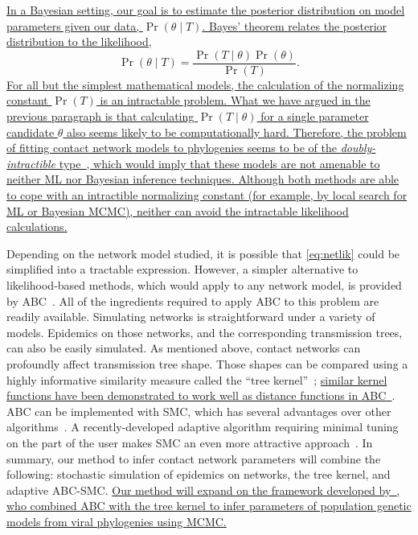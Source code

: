 {\color{blue}\uline{
In a Bayesian setting, our goal is to estimate the posterior distribution on
model parameters given our data, $\Pr(\theta \mid T)$. Bayes' theorem relates
the posterior distribution to the likelihood,}
\[
  \Pr(\theta \mid T) = \frac{\Pr(T \mid \theta) \Pr(\theta)}{\Pr(T)}.
\]
\uline{For all but the simplest mathematical models, the calculation of the
normalizing constant $\Pr(T)$ is an intractable problem. What we have argued in
the previous paragraph is that calculating $\Pr(T \mid \theta)$ for a single
parameter candidate $\theta$ also seems likely to be computationally hard.
Therefore, the problem of fitting contact network models to phylogenies seems
to be of the \emph{doubly-intractible} type~\autocite{murray2012mcmc}, which
would imply that these models are not amenable to neither \gls{ML} nor Bayesian
inference techniques. Although both methods are able to cope with an
intractible normalizing constant (for example, by local search for \gls{ML} or
Bayesian \gls{MCMC}), neither can avoid the intractable likelihood
calculations. }}

Depending on the network model studied, it is possible that \cref{eq:netlik}
could be simplified into a tractable expression. However, a simpler alternative
to likelihood-based methods, which would apply to any network model, is
provided by \gls{ABC}~\autocite{rubin1984bayesianly, tavare1997inferring,
fu1997estimating, beaumont2002approximate}. All of the ingredients required to
apply \gls{ABC} to this problem are readily available. Simulating networks is
straightforward under a variety of models. Epidemics on those networks, and the
corresponding transmission trees, can also be easily simulated. As mentioned
above, contact networks can profoundly affect transmission tree shape. Those
shapes can be compared using a highly informative similarity measure called the
``tree kernel''~\autocite{poon2013mapping}; {\color{blue}\uline{similar kernel
functions have been demonstrated to work well as distance functions in
\gls{ABC}~\autocite{park2015k2}}}. \Gls{ABC} can be implemented with \gls{SMC},
which has several advantages over other
algorithms~\autocite{mckinley2009inference}. A recently-developed adaptive
algorithm requiring minimal tuning on the part of the user makes \gls{SMC} an
even more attractive approach~\autocite{del2012adaptive}. In summary, our
method to infer contact network parameters will combine the following:
stochastic simulation of epidemics on networks, the tree kernel, and adaptive
\gls{ABC}-\gls{SMC}. {\color{blue}\uline{ Our method will expand on the
framework developed by~\autocite{poon2015phylodynamic}, who combined \gls{ABC}
with the tree kernel to infer parameters of population genetic models from
viral phylogenies using \gls{MCMC}. }}

